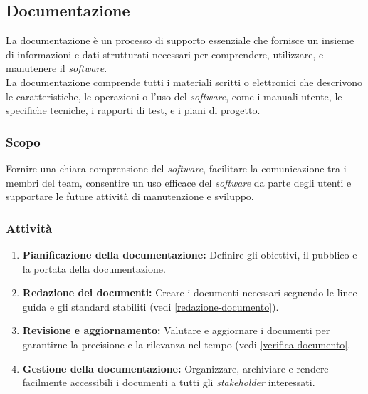 \subsection{Documentazione}

La documentazione è un processo di supporto essenziale che fornisce un insieme
di informazioni e dati strutturati necessari per comprendere, utilizzare, e
manutenere il \textit{software}.\\
La documentazione comprende tutti i materiali scritti o elettronici che
descrivono le caratteristiche, le operazioni o l'uso del \textit{software},
come i manuali utente, le specifiche tecniche, i rapporti di test, e i piani di
progetto.

\subsubsection{Scopo}
Fornire una chiara comprensione del \textit{software}, facilitare la
comunicazione tra i membri del team, consentire un uso efficace del
\textit{software} da parte degli utenti e supportare le future attività di
manutenzione e sviluppo.

\subsubsection{Attività}
\begin{enumerate}
	\item \textbf{Pianificazione della documentazione:} Definire gli obiettivi,
	      il pubblico e la portata della documentazione.
	\item \textbf{Redazione dei documenti:} Creare i documenti necessari
	      seguendo le linee guida e gli standard stabiliti
	      (vedi \autoref{redazione-documento}).
	\item \textbf{Revisione e aggiornamento:} Valutare e aggiornare i documenti
	      per garantirne la precisione e la rilevanza nel tempo (vedi
	      \autoref{verifica-documento}.
	\item \textbf{Gestione della documentazione:} Organizzare, archiviare e
	      rendere facilmente accessibili i documenti a tutti gli
	      \textit{stakeholder} interessati.
\end{enumerate}

